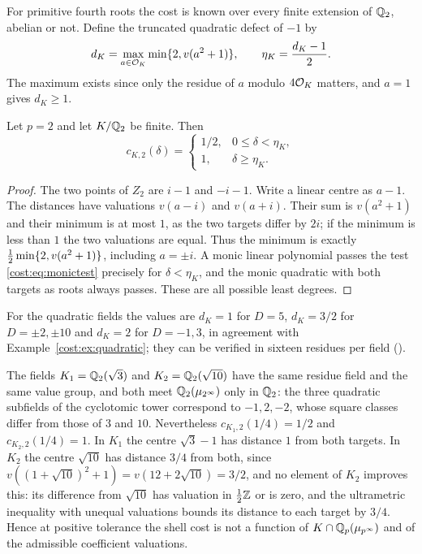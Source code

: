 For primitive fourth roots the cost is known over every finite extension of $\mathbb{Q}_2$, abelian
or not. Define the truncated quadratic defect of $-1$ by
\[
 d_K=\max_{a\in\mathcal{O}_K}\min\{2,v(a^2+1)\},\qquad\eta_K=\frac{d_K-1}2.
\]
The maximum exists since only the residue of $a$ modulo $4\mathcal{O}_K$ matters, and $a=1$ gives
$d_K\ge1$.

\begin{proposition}\label{cost:prop:fourth}
Let $p=2$ and let $K/\mathbb{Q}_2$ be finite. Then
\[
 c_{K,2}(\delta)=\begin{cases}1/2,&0\le\delta<\eta_K,\\ 1,&\delta\ge\eta_K.\end{cases}
\]
\end{proposition}

\begin{proof}
The two points of $Z_2$ are $i-1$ and $-i-1$. Write a linear centre as $a-1$. The
distances have valuations $v(a-i)$ and $v(a+i)$. Their sum is $v(a^2+1)$ and their minimum
is at most $1$, as the two targets differ by $2i$; if the minimum is less than $1$ the two
valuations are equal. Thus the minimum is exactly $\tfrac12\min\{2,v(a^2+1)\}$,
including $a=\pm i$. A monic linear polynomial passes the test \eqref{cost:eq:monictest}
precisely for $\delta<\eta_K$, and the monic quadratic with both targets as roots always
passes. These are all possible least degrees.
\end{proof}

For the quadratic fields the values are $d_K=1$ for $D=5$, $d_K=3/2$ for
$D=\pm2,\pm10$ and $d_K=2$ for $D=-1,3$, in agreement with Example~\ref{cost:ex:quadratic}; they
can be verified in sixteen residues per field
().

\begin{remark}\label{cost:rem:twofields}
The fields $K_1=\mathbb{Q}_2(\sqrt3)$ and $K_2=\mathbb{Q}_2(\sqrt{10})$ have the same residue field and the
same value group, and both meet $\mathbb{Q}_2(\mu_{2^\infty})$ only in $\mathbb{Q}_2$: the three quadratic
subfields of the cyclotomic tower correspond to $-1,2,-2$, whose square classes differ from
those of $3$ and $10$. Nevertheless $c_{K_1,2}(1/4)=1/2$ and $c_{K_2,2}(1/4)=1$. In $K_1$
the centre $\sqrt3-1$ has distance $1$ from both targets. In $K_2$ the centre $\sqrt{10}$
has distance $3/4$ from both, since
$v((1+\sqrt{10})^2+1)=v(12+2\sqrt{10})=3/2$, and no element of $K_2$ improves this: its
difference from $\sqrt{10}$ has valuation in $\tfrac12\mathbb{Z}$ or is zero, and the ultrametric
inequality with unequal valuations bounds its distance to each target by $3/4$. Hence at
positive tolerance the shell cost is not a function of $K\cap\mathbb{Q}_p(\mu_{p^\infty})$ and of
the admissible coefficient valuations.
\end{remark}

